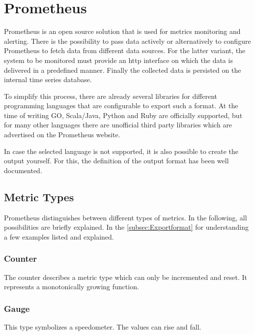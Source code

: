 \section{Prometheus}
Prometheus is an open source solution that is used for metrics monitoring and alerting. There is the possibility to pass data actively or alternatively to configure Prometheus to fetch data from different data sources. For the latter variant, the system to be monitored must provide an \gls{http} interface on which the data is delivered in a predefined manner. Finally the collected data is persisted on the internal time series database.

To simplify this process, there are already several libraries for different programming languages that are configurable to export such a format. At the time of writing GO, Scala/Java, Python and Ruby are officially supported, but for many other languages there are unofficial third party libraries which are advertised on the Prometheus website. 

In case the selected language is not supported, it is also possible to create the output yourself. For this, the definition of the output format has been well documented.
\subsection{Metric Types}
Prometheus distinguishes between different types of metrics. In the following, all possibilities are briefly explained. In the \autoref{subsec:Exportformat} for understanding a few examples listed and explained.
\subsubsection{Counter}
The counter describes a metric type which can only be incremented and reset. It represents a monotonically growing function. 
\subsubsection{Gauge}
This type symbolizes a speedometer. The values can rise and fall.
